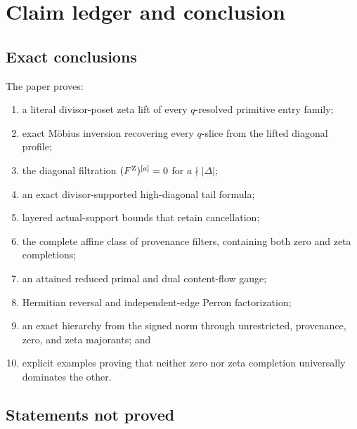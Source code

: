 \section{Claim ledger and conclusion}
\label{sec:claim-boundary}

\subsection{Exact conclusions}

The paper proves:
\begin{enumerate}[label=\textup{(\arabic*)},leftmargin=2.8em]
 \item a literal divisor-poset zeta lift of every \(q\)-resolved primitive
       entry family;
 \item exact M\"obius inversion recovering every \(q\)-slice from the
       lifted diagonal profile;
 \item the diagonal filtration
       \((F^{\rm Z})^{[a]}=0\) for \(a\nmid|\Delta|\);
 \item an exact divisor-supported high-diagonal tail formula;
 \item layered actual-support bounds that retain cancellation;
 \item the complete affine class of provenance filters, containing both
       zero and zeta completions;
 \item an attained reduced primal and dual content-flow gauge;
 \item Hermitian reversal and independent-edge Perron factorization;
 \item an exact hierarchy from the signed norm through unrestricted,
       provenance, zero, and zeta majorants; and
 \item explicit examples proving that neither zero nor zeta completion
       universally dominates the other.
\end{enumerate}

\subsection{Statements not proved}

